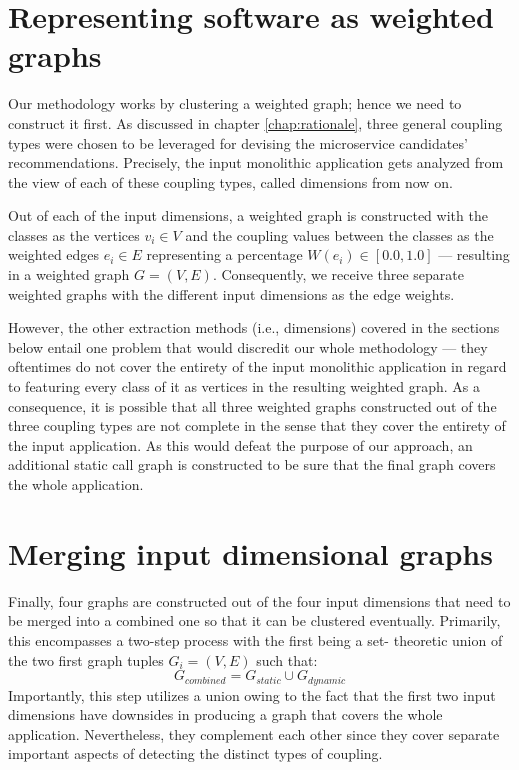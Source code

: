\documentclass[12pt,a4paper]{report}
\begin{document}
\section{Representing software as weighted graphs} \label{sect:software-as-weighted-graph}

Our methodology works by clustering a weighted graph; hence we need to
construct it first. As discussed in chapter \ref{chap:rationale}, three general
coupling types were chosen to be leveraged for devising the microservice
candidates' recommendations. Precisely, the input monolithic application gets
analyzed from the view of each of these coupling types, called dimensions from
now on.

Out of each of the input dimensions, a weighted graph is constructed with the
classes as the vertices \(v_i \in V\) and the coupling values between the
classes as the weighted edges \(e_i \in E\) representing a percentage \(W(e_i)
\in [0.0, 1.0]\) --- resulting in a weighted graph \(G = (V, E)\).
Consequently, we receive three separate weighted graphs with the different
input dimensions as the edge weights.

However, the other extraction methods (i.e., dimensions) covered in the
sections below entail one problem that would discredit our whole
methodology --- they oftentimes do not cover the entirety of the input
monolithic application in regard to featuring every class of it as vertices in
the resulting weighted graph. As a consequence, it is possible that all three
weighted graphs constructed out of the three coupling types are not complete in
the sense that they cover the entirety of the input application. As this would
defeat the purpose of our approach, an additional static call graph is
constructed to be sure that the final graph covers the whole application.



\section{Merging input dimensional graphs} \label{sect:merging-graphs}

Finally, four graphs are constructed out of the four input dimensions that need
to be merged into a combined one so that it can be clustered eventually.
Primarily, this encompasses a two-step process with the first being a set-
theoretic union of the two first graph tuples \(G_i = (V, E)\) such that:
\[
  G_{combined} = G_{static} \cup G_{dynamic}
\]
Importantly, this step utilizes a
union owing to the fact that the first two input dimensions have downsides in
producing a graph that covers the whole application. Nevertheless, they
complement each other since they cover separate important aspects of detecting
the distinct types of coupling.
\end{document}
